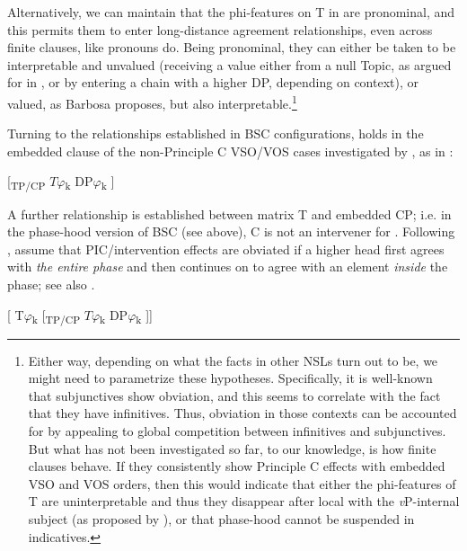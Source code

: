 \documentclass[output=paper]{langsci/langscibook}
\begin{document}
Alternatively, we can maintain that the phi-features on T in  are pronominal, and this permits them to enter long-distance agreement relationships, even across finite clauses, like pronouns do. Being pronominal, they can either be taken to be interpretable and unvalued (receiving a value either from a null Topic, as argued for in \citet{Frascarelli2007}, or by entering a chain with a higher DP, depending on context), or valued, as Barbosa proposes, but also interpretable.\footnote{Either way, depending on what the facts in other NSLs turn out to be, we might need to parametrize these hypotheses. Specifically, it is well-known that  subjunctives show obviation, and this seems to correlate with the fact that they have infinitives. Thus, obviation in those contexts can be accounted for by appealing to global competition between infinitives and subjunctives. But what has not been investigated so far, to our knowledge, is how finite clauses behave. If they consistently show Principle C effects with embedded VSO and VOS orders, then this would indicate that either the phi-features of T are uninterpretable and thus they disappear after local  with the \textit{v}P-internal subject (as proposed by \citealt{Barbosa2009}), or that phase-hood cannot be suspended in  indicatives.} 

Turning to the  relationships established in BSC configurations,  holds in the embedded clause of the non-Principle C VSO\slash VOS cases investigated by \citet{Tsakali2017}, as in :

\ea%
    \label{ex:alexiadou:31}
     \textsubscript{} [\textsubscript{TP/CP}    $T\varphi $\textsubscript{k}    DP$\varphi $\textsubscript{k}  ] 
\z
       

A further  relationship is established between matrix T and embedded CP; i.e. in the phase-hood version of BSC (see above), C is not an intervener for . Following \citet{Rackowski2005}, \citet{Tsakali2017} assume that PIC\slash intervention effects are obviated if a higher head first agrees with \textit{the entire phase} and then continues on to agree with an element \textit{inside} the phase; see also \citet{Halpert2016}. 

\ea%
    \label{ex:alexiadou:32}
    [   T$\varphi $\textsubscript{k} [\textsubscript{TP/CP}    $T\varphi $\textsubscript{k}    DP$\varphi $\textsubscript{k}  ]]      
\z
    
\end{document}
